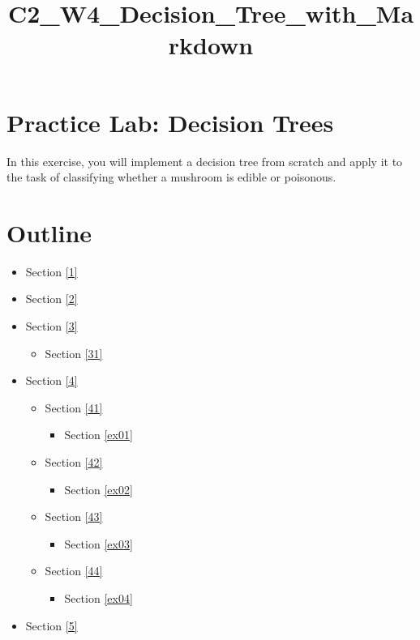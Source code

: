 \documentclass[11pt]{article}
\title{C2\_W4\_Decision\_Tree\_with\_Markdown}
\providecommand{\tightlist}{%
      \setlength{\itemsep}{0pt}\setlength{\parskip}{0pt}}
\begin{document}
    
    \maketitle
    
    

    
    \hypertarget{practice-lab-decision-trees}{%
\section{Practice Lab: Decision
Trees}\label{practice-lab-decision-trees}}

In this exercise, you will implement a decision tree from scratch and
apply it to the task of classifying whether a mushroom is edible or
poisonous.

\hypertarget{outline}{%
\section{Outline}\label{outline}}

\begin{itemize}
\tightlist
\item
  Section \ref{1}
\item
  Section \ref{2}
\item
  Section \ref{3}

  \begin{itemize}
  \tightlist
  \item
    Section \ref{31}
  \end{itemize}
\item
  Section \ref{4}

  \begin{itemize}
  \tightlist
  \item
    Section \ref{41}

    \begin{itemize}
    \tightlist
    \item
      Section \ref{ex01}
    \end{itemize}
  \item
    Section \ref{42}

    \begin{itemize}
    \tightlist
    \item
      Section \ref{ex02}
    \end{itemize}
  \item
    Section \ref{43}

    \begin{itemize}
    \tightlist
    \item
      Section \ref{ex03}
    \end{itemize}
  \item
    Section \ref{44}

    \begin{itemize}
    \tightlist
    \item
      Section \ref{ex04}
    \end{itemize}
  \end{itemize}
\item
  Section \ref{5}
\end{itemize}
\end{document}
